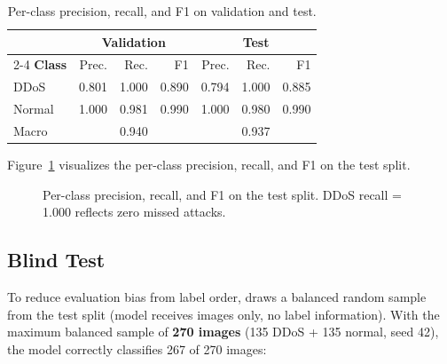 \documentclass[conference]{IEEEtran}
\begin{document}
\begin{table}[htbp]
\centering
\caption{Per-class precision, recall, and F1 on validation and test.}
\label{tab:perclass}
\renewcommand{\arraystretch}{1.1}
\begin{tabular}{@{}lrrrrrr@{}}
\toprule
 & \multicolumn{3}{c}{\textbf{Validation}} & \multicolumn{3}{c}{\textbf{Test}} \\
\cmidrule{2-4}\cmidrule{5-7}
\textbf{Class} & Prec. & Rec. & F1 & Prec. & Rec. & F1 \\
\midrule
DDoS   & 0.801 & 1.000 & 0.890 & 0.794 & 1.000 & 0.885 \\
Normal & 1.000 & 0.981 & 0.990 & 1.000 & 0.980 & 0.990 \\
\midrule
Macro  & \multicolumn{3}{c}{0.940} & \multicolumn{3}{c}{0.937} \\
\bottomrule
\end{tabular}
\end{table}

Figure~\ref{fig:barchart} visualizes the per-class precision, recall, and F1
on the test split.

\begin{figure}[htbp]
  \centering
  \caption{Per-class precision, recall, and F1 on the test split.
           DDoS recall = 1.000 reflects zero missed attacks.}
  \label{fig:barchart}
\end{figure}

\subsection{Blind Test}
To reduce evaluation bias from label order, 
draws a balanced random sample from the test split (model receives images only,
no label information).
With the maximum balanced sample of \textbf{270 images} (135 DDoS + 135 normal,
seed 42), the model correctly classifies 267 of 270 images:
\end{document}

